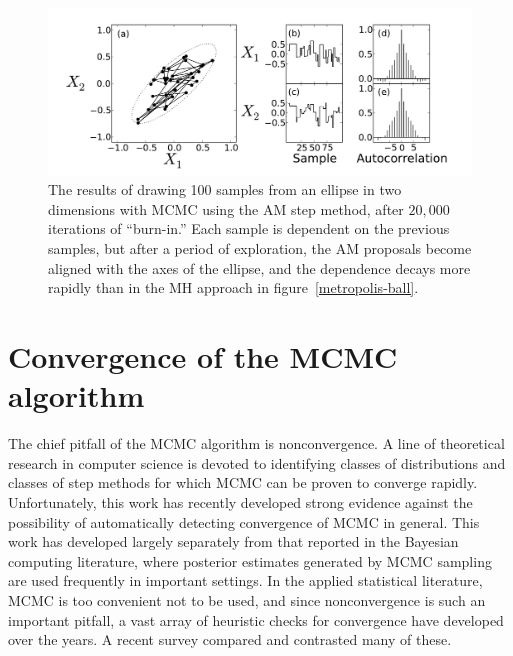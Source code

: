 \begin{figure}[ht]
\begin{center}
\includegraphics[width=\textwidth]{am-ball-2.pdf}
\caption{The results of drawing 100 samples from an ellipse in two
  dimensions with MCMC using the AM step method, after $20,000$
  iterations of ``burn-in.''  Each sample is dependent on the previous
  samples, but after a period of exploration, the AM proposals become
  aligned with the axes of the ellipse, and the dependence decays more
  rapidly than in the MH approach in figure~\ref{metropolis-ball}.}
\label{am-ball}
\end{center}
\end{figure}

\section{Convergence of the MCMC algorithm}

The chief pitfall of the MCMC algorithm is nonconvergence.  A line of
theoretical research in computer science is devoted to identifying
classes of distributions and classes of step methods for which MCMC
can be proven to converge
rapidly.\cite{dyer_random_1991,bubley_path_1997,
  dyer_markov_2000,geyer_introduction_2010} Unfortunately, this work
has recently developed strong evidence against the possibility of
automatically detecting convergence of MCMC in
general.\cite{bhatnagar_computational_2011} This work has developed
largely separately from that reported in the Bayesian computing literature, where
posterior estimates generated by MCMC sampling are used frequently in
important
settings.\cite{gilks_markov_1996,jon_wakefield_bayesian_1996,gelman_bayesian_2003}
In the applied statistical literature, MCMC is too convenient not to
be used, and since nonconvergence is such an important pitfall, a vast
array of heuristic checks for convergence have developed over the
years. A recent survey compared and contrasted many of
these.\cite{mengersen_mcmc_1999}

